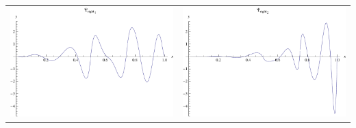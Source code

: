 \documentclass{article}
\begin{document}
\begin{landscape}
\begin{tabular}{cc}
\includegraphics[width=10.cm]{septic_wavelet_dright_1.pdf}& \includegraphics[width=10.cm]{septic_wavelet_dright_2.pdf} \\
\end{tabular} 
 \end{landscape}
\end{document}
